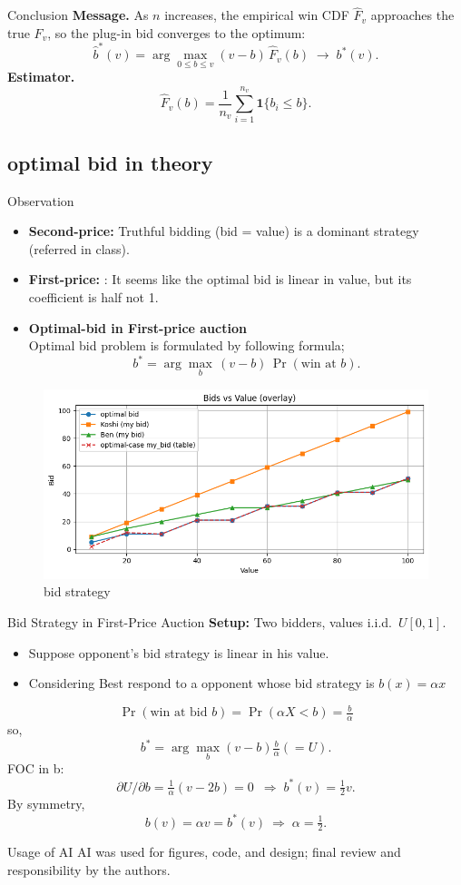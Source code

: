 \documentclass{beamer}
\begin{document}
\begin{frame}{Conclusion}
\small
\textbf{Message.} As $n$ increases, the empirical win CDF $\hat F_v$ approaches the true $F_v$, so the plug-in bid converges to the optimum:
\[
\hat b^*(v)=\arg\max_{0\le b\le v} (v-b)\,\hat F_v(b)
\;\longrightarrow\;
b^*(v).
\]
\textbf{Estimator.}
\[
\hat F_v(b)=\frac{1}{n_v}\sum_{i=1}^{n_v}\mathbf{1}\{b_i\le b\}.
\]
\end{frame}


\subsection{optimal bid in theory}

\begin{frame}{Observation}
\small
\begin{itemize}
  \item \textbf{Second-price:} Truthful bidding (bid = value) is a dominant strategy (referred in class).
  \item \textbf{First-price:} : It seems like the optimal bid is linear in value, but its coefficient is half not 1.\\
  \item \textbf{Optimal-bid in First-price auction}\\
  Optimal bid problem is formulated by following formula;
    \[  
        b^{*}=\arg\max_{b}\,(v-b)\,\Pr(\text{win at } b).
    \]
\end{itemize}
\begin{figure}
    \centering
    \includegraphics[width=0.5\linewidth]{332Project1/figures/bid.png}
    \caption{bid strategy}
    \label{fig:placeholder}
\end{figure}
\end{frame}

\begin{frame}{Bid Strategy in First-Price Auction}
\small
\textbf{Setup:} Two bidders, values i.i.d.\ $U[0,1]$.\\
\begin{itemize}
    \item Suppose opponent's bid strategy is linear in his value.
    \item Considering Best respond to a opponent whose bid strategy is $b(x)=\alpha x$
\end{itemize}
\[
\Pr(\text{win at bid }b)=\Pr(\alpha X<b)=\tfrac{b}{\alpha}
\]
so, 
\[
b^{*}=\arg\max_{b}(v-b)\tfrac{b}{\alpha} (= U).
\]
FOC in b:\\
\[
\partial U/\partial b=\tfrac{1}{\alpha}(v-2b)=0 \;\ \Rightarrow\; b^*(v)=\tfrac12 v.
\]
By symmetry, 
\[
b(v)=\alpha v=b^*(v) \ \Rightarrow\; \alpha=\tfrac12.
\]

\end{frame}

\begin{frame}{Usage of AI}
    AI was used for figures, code, and design; final review and responsibility by the authors.
\end{frame}
\end{document}
